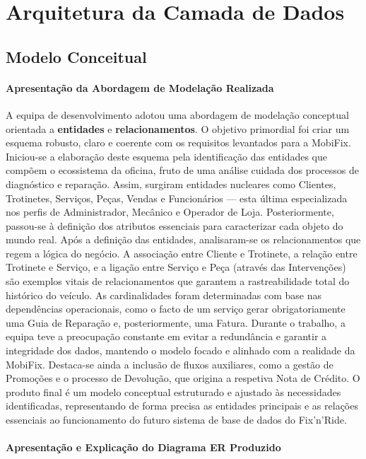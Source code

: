 \documentclass[a4paper,12pt]{scrreprt}
\begin{document}
\chapter{Arquitetura da Camada de Dados}
\section{Modelo Conceitual}
\subsubsection{Apresentação da Abordagem de Modelação Realizada
}
A equipa de desenvolvimento adotou uma abordagem de modelação conceptual orientada a \textbf{entidades} e \textbf{relacionamentos}. O objetivo primordial foi criar um esquema robusto, claro e coerente com os requisitos levantados para a MobiFix. Iniciou-se a elaboração deste esquema pela identificação das entidades que compõem o ecossistema da oficina, fruto de uma análise cuidada dos processos de diagnóstico e reparação. Assim, surgiram entidades nucleares como Clientes, Trotinetes, Serviços, Peças, Vendas e Funcionários — esta última especializada nos perfis de Administrador, Mecânico e Operador de Loja. Posteriormente, passou-se à definição dos atributos essenciais para caracterizar cada objeto do mundo real. Após a definição das entidades, analisaram-se os relacionamentos que regem a lógica do negócio. A associação entre Cliente e Trotinete, a relação entre Trotinete e Serviço, e a ligação entre Serviço e Peça (através das Intervenções) são exemplos vitais de relacionamentos que garantem a rastreabilidade total do histórico do veículo. As cardinalidades foram determinadas com base nas dependências operacionais, como o facto de um serviço gerar obrigatoriamente uma Guia de Reparação e, posteriormente, uma Fatura. Durante o trabalho, a equipa teve a preocupação constante em evitar a redundância e garantir a integridade dos dados, mantendo o modelo focado e alinhado com a realidade da MobiFix. Destaca-se ainda a inclusão de fluxos auxiliares, como a gestão de Promoções e o processo de Devolução, que origina a respetiva Nota de Crédito. O produto final é um modelo conceptual estruturado e ajustado às necessidades identificadas, representando de forma precisa as entidades principais e as relações essenciais ao funcionamento do futuro sistema de base de dados do Fix'n'Ride. \subsubsection{Apresentação e Explicação do Diagrama ER Produzido}
\end{document}
